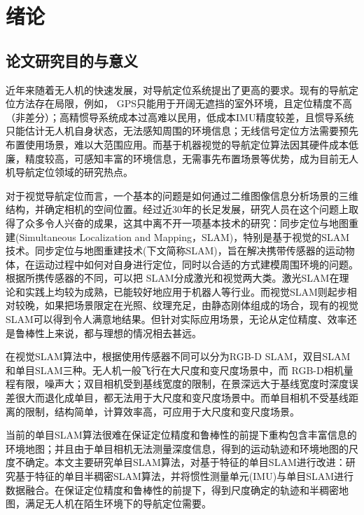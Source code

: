 
\chapter{绪论}
\label{chap:intro}

\section{论文研究目的与意义}
近年来随着无人机的快速发展，对导航定位系统提出了更高的要求。现有的导航定位方法存在局限，例如， GPS只能用于开阔无遮挡的室外环境，且定位精度不高（非差分）；高精惯导系统成本过高难以民用，低成本IMU精度较差，且惯导系统只能估计无人机自身状态，无法感知周围的环境信息；无线信号定位方法需要预先布置使用场景，难以大范围应用。而基于机器视觉的导航定位算法因其硬件成本低廉，精度较高，可感知丰富的环境信息，无需事先布置场景等优势，成为目前无人机导航定位领域的研究热点。

对于视觉导航定位而言，一个基本的问题是如何通过二维图像信息分析场景的三维结构，并确定相机的空间位置\upcite{[1.1]}。经过近30年的长足发展，研究人员在这个问题上取得了众多令人兴奋的成果，这其中离不开一项基本技术的研究：同步定位与地图重建(Simultaneous Localization and Mapping，SLAM)，特别是基于视觉的SLAM技术。同步定位与地图重建技术(下文简称SLAM)，旨在解决携带传感器的运动物体，在运动过程中如何对自身进行定位，同时以合适的方式建模周围环境的问题\upcite{[1.2]}。根据所携传感器的不同，可以把 SLAM分成激光和视觉两大类。激光SLAM在理论和实践上均较为成熟，已能较好地应用于机器人等行业。而视觉SLAM则起步相对较晚，如果把场景限定在光照、纹理充足，由静态刚体组成的场合，现有的视觉SLAM可以得到令人满意地结果。但针对实际应用场景，无论从定位精度、效率还是鲁棒性上来说，都与理想的情况相去甚远。

在视觉SLAM算法中，根据使用传感器不同可以分为RGB-D SLAM，双目SLAM和单目SLAM三种\upcite{[1.3]}。无人机一般飞行在大尺度和变尺度场景中，而 RGB-D相机量程有限，噪声大；双目相机受到基线宽度的限制，在景深远大于基线宽度时深度误差很大而退化成单目，都无法用于大尺度和变尺度场景中。而单目相机不受基线距离的限制，结构简单，计算效率高，可应用于大尺度和变尺度场景。

当前的单目SLAM算法很难在保证定位精度和鲁棒性的前提下重构包含丰富信息的环境地图；并且由于单目相机无法测量深度信息，得到的运动轨迹和环境地图的尺度不确定。本文主要研究单目SLAM算法，对基于特征的单目SLAM进行改进：研究基于特征的单目半稠密SLAM算法，并将惯性测量单元(IMU)与单目SLAM进行数据融合。在保证定位精度和鲁棒性的前提下，得到尺度确定的轨迹和半稠密地图，满足无人机在陌生环境下的导航定位需要。


